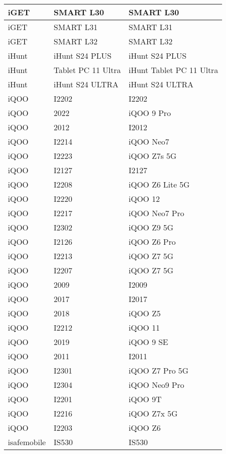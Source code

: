 \begin{tabularx}{\linewidth}{|l|X|X|}
        iGET & SMART L30 & SMART L30 \\ \hline
        iGET & SMART L31 & SMART L31 \\ \hline
        iGET & SMART L32 & SMART L32 \\ \hline
        iHunt & iHunt S24 PLUS & iHunt S24 PLUS \\ \hline
        iHunt & Tablet PC 11 Ultra & iHunt Tablet PC 11 Ultra \\ \hline
        iHunt & iHunt S24 ULTRA & iHunt S24 ULTRA \\ \hline
        iQOO & I2202 & I2202 \\ \hline
        iQOO & 2022 & iQOO 9 Pro \\ \hline
        iQOO & 2012 & I2012 \\ \hline
        iQOO & I2214 & iQOO Neo7 \\ \hline
        iQOO & I2223 & iQOO Z7s 5G \\ \hline
        iQOO & I2127 & I2127 \\ \hline
        iQOO & I2208 & iQOO Z6 Lite 5G \\ \hline
        iQOO & I2220 & iQOO 12 \\ \hline
        iQOO & I2217 & iQOO Neo7 Pro \\ \hline
        iQOO & I2302 & iQOO Z9 5G \\ \hline
        iQOO & I2126 & iQOO Z6 Pro \\ \hline
        iQOO & I2213 & iQOO Z7 5G \\ \hline
        iQOO & I2207 & iQOO Z7 5G \\ \hline
        iQOO & 2009 & I2009 \\ \hline
        iQOO & 2017 & I2017 \\ \hline
        iQOO & 2018 & iQOO Z5 \\ \hline
        iQOO & I2212 & iQOO 11 \\ \hline
        iQOO & 2019 & iQOO 9 SE \\ \hline
        iQOO & 2011 & I2011 \\ \hline
        iQOO & I2301 & iQOO Z7 Pro 5G \\ \hline
        iQOO & I2304 & iQOO Neo9 Pro \\ \hline
        iQOO & I2201 & iQOO 9T \\ \hline
        iQOO & I2216 & iQOO Z7x 5G \\ \hline
        iQOO & I2203 & iQOO Z6 \\ \hline
        isafemobile & IS530 & IS530 \\ \hline

\end{tabularx}
